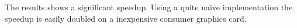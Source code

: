 The results shows a significant speedup. Using a quite
naive implementation the speedup is easily doubled on a inexpensive
consumer graphics card.





\begin{comment}
#+ORGTBL: SEND numbers orgtbl-to-latex :splice t :skip 2
|------------------+-------------+-------------+-----------|
|                  | CPU         | GPU         |   Speedup |
|------------------+-------------+-------------+-----------|
| Reinitialization | 355179 usec | 138011 usec | 2.5735557 |
|------------------+-------------+-------------+-----------|
#+TBLFM: @2$4=@2$2 / @2$3
\end{comment}


